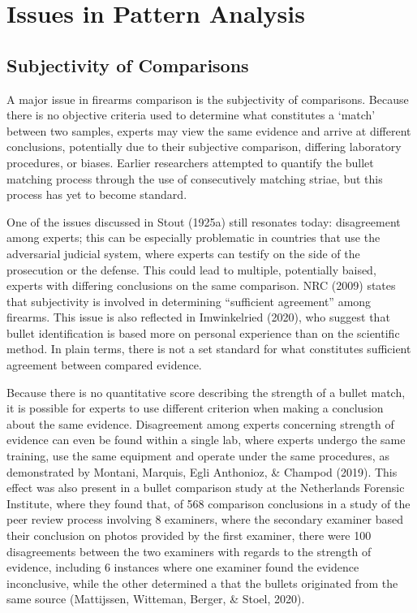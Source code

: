 \documentclass[print]{nuthesis}
\begin{document}
\hypertarget{issues-in-pattern-analysis}{%
\section{Issues in Pattern Analysis}\label{issues-in-pattern-analysis}}

\hypertarget{subjectivity-of-comparisons}{%
\subsection{Subjectivity of Comparisons}\label{subjectivity-of-comparisons}}

A major issue in firearms comparison is the subjectivity of comparisons.
Because there is no objective criteria used to determine what constitutes a `match' between two samples, experts may view the same evidence and arrive at different conclusions, potentially due to their subjective comparison, differing laboratory procedures, or biases.
Earlier researchers attempted to quantify the bullet matching process through the use of consecutively matching striae, but this process has yet to become standard.

One of the issues discussed in Stout (1925a) still resonates today: disagreement among experts; this can be especially problematic in countries that use the adversarial judicial system, where experts can testify on the side of the prosecution or the defense.
This could lead to multiple, potentially baised, experts with differing conclusions on the same comparison.
NRC (2009) states that subjectivity is involved in determining ``sufficient agreement'' among firearms.
This issue is also reflected in Imwinkelried (2020), who suggest that bullet identification is based more on personal experience than on the scientific method.
In plain terms, there is not a set standard for what constitutes sufficient agreement between compared evidence.

Because there is no quantitative score describing the strength of a bullet match, it is possible for experts to use different criterion when making a conclusion about the same evidence.
Disagreement among experts concerning strength of evidence can even be found within a single lab, where experts undergo the same training, use the same equipment and operate under the same procedures, as demonstrated by Montani, Marquis, Egli Anthonioz, \& Champod (2019).
This effect was also present in a bullet comparison study at the Netherlands Forensic Institute, where they found that, of 568 comparison conclusions in a study of the peer review process involving 8 examiners, where the secondary examiner based their conclusion on photos provided by the first examiner, there were 100 disagreements between the two examiners with regards to the strength of evidence, including 6 instances where one examiner found the evidence inconclusive, while the other determined a that the bullets originated from the same source (Mattijssen, Witteman, Berger, \& Stoel, 2020).
\end{document}
